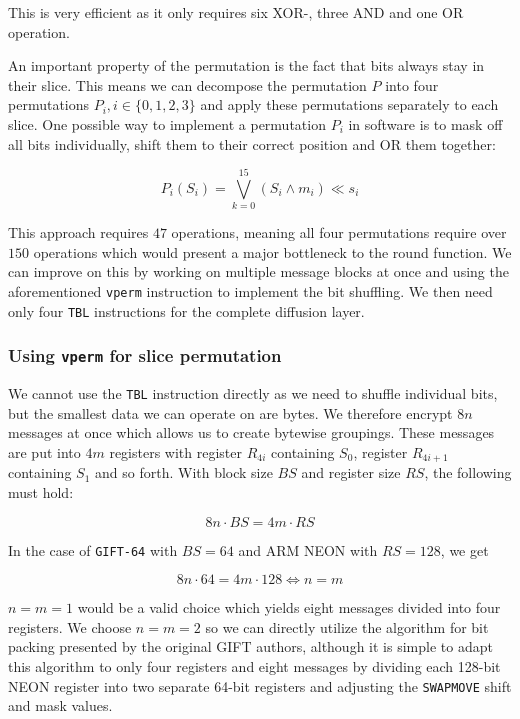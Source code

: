 \documentclass[12pt]{report}
\begin{document}
This is very efficient as it only requires six XOR-, three AND and one OR
operation.

An important property of the permutation is the fact that bits always stay in
their slice. This means we can decompose the permutation $P$ into four
permutations $P_i,i\in\{0,1,2,3\}$ and apply these permutations
separately to each slice. One possible way to implement a permutation $P_i$ in
software is to mask off all bits individually, shift them to their correct
position and OR them together:

\[
    P_i(S_i)=\bigvee_{k=0}^{15}{(S_i\land m_i) \ll s_i}
\]

This approach requires $47$ operations, meaning all four permutations require
over $150$ operations which would present a major bottleneck to the round
function. We can improve on this by working on multiple message blocks at once
and using the aforementioned \texttt{vperm} instruction to implement the bit
shuffling. We then need only four \texttt{TBL} instructions for the complete
diffusion layer.

\subsubsection{Using \texttt{vperm} for slice permutation}

We cannot use the \texttt{TBL} instruction directly as we need to shuffle
individual bits, but the smallest data we can operate on are bytes. We
therefore encrypt $8n$ messages at once which allows us to create bytewise
groupings. These messages are put into $4m$ registers with register $R_{4i}$
containing $S_0$, register $R_{4i+1}$ containing $S_1$ and so forth. With block
size $BS$ and register size $RS$, the following must hold:

\[
    8n\cdot BS=4m\cdot RS
\]

In the case of \texttt{GIFT-64} with $BS=64$ and ARM NEON with $RS=128$, we get

\[
    8n\cdot 64=4m\cdot 128\Leftrightarrow n=m
\]

$n=m=1$ would be a valid choice which yields eight messages divided into four
registers. We choose $n=m=2$ so we can directly utilize the algorithm for bit
packing presented by the original GIFT authors, although it is simple to adapt
this algorithm to only four registers and eight messages by dividing each
128-bit NEON register into two separate 64-bit registers and adjusting the
\texttt{SWAPMOVE} shift and mask values.
\end{document}
